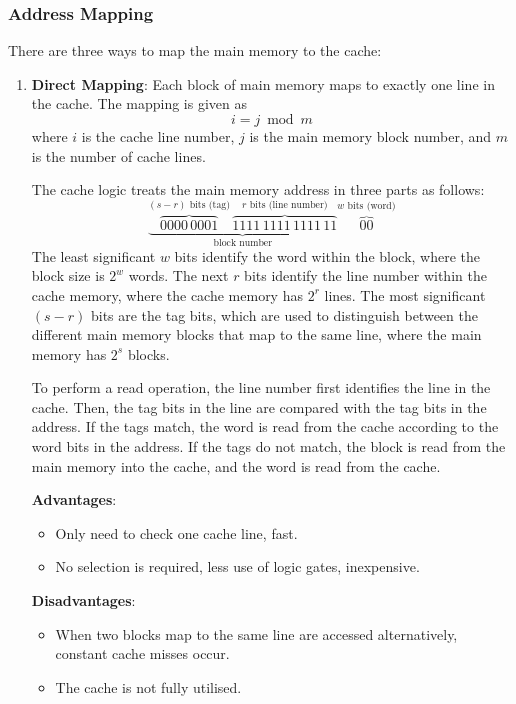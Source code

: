 \subsubsection{Address Mapping}

There are three ways to map the main memory to the cache:
\begin{enumerate}
\item \textbf{Direct Mapping}: 
    Each block of main memory maps to exactly one line in the cache. The mapping is
    given as 
    \[i = j \bmod m\]
    where $i$ is the cache line number, $j$ is the main memory
    block number, and $m$ is the number of cache lines.
    
    \begin{example}
        The cache logic treats the main memory address in three parts as follows:
        \begin{equation*}
            \underbrace{
            \overbrace{0000\,0001}^{(s-r)\text{ bits (tag)}}\,
            \overbrace{1111\,1111\,1111\,11}^{r\text{ bits (line number)}}}
            _{\text{block number}}
            \overbrace{00}^{w\text{ bits (word)}}
        \end{equation*}
        The least significant $w$ bits identify the word within the block,
        where the block size is $2^w$ words. The next $r$ bits identify the line
        number within the cache memory, where the cache memory has $2^r$ lines.
        The most significant $(s-r)$ bits are the tag bits, which are used to
        distinguish between the different main memory blocks that map to the same line,
        where the main memory has $2^s$ blocks.
    \end{example}

    To perform a read operation, the line number first identifies the line in the cache.
    Then, the tag bits in the line are compared with the tag bits in the address.
    If the tags match, the word is read from the cache according to the word bits in the
    address. If the tags do not match, the block is read from the main memory into the
    cache, and the word is read from the cache.

    \begin{multicols}{2}
        \textbf{Advantages}: \begin{itemize}
            \item Only need to check one cache line, fast.
            \item No selection is required, less use of logic gates, inexpensive.
        \end{itemize}
        \columnbreak
        \textbf{Disadvantages}: \begin{itemize}
            \item When two blocks map to the same line are accessed alternatively,
                constant cache misses occur.
            \item The cache is not fully utilised.
        \end{itemize}
    \end{multicols}


\end{enumerate}
